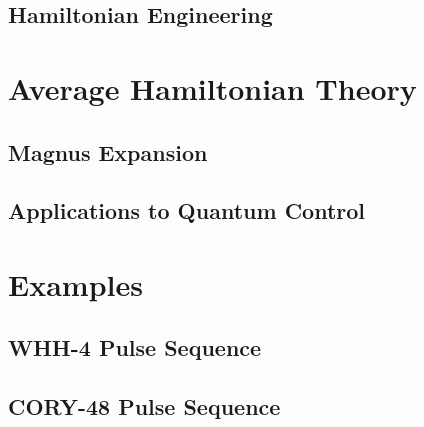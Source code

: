 
\lipsum[1]

\subsection{Hamiltonian Engineering}

\lipsum[1-4]

%

\section{Average Hamiltonian Theory}\label{sec:AHT}

\lipsum[1-2]

\subsection{Magnus Expansion}

\lipsum[1-2]

\subsection{Applications to Quantum Control}

\lipsum[1-5]


\section{Examples}

\lipsum[1]

\subsection{WHH-4 Pulse Sequence}

\lipsum[1-3]

\subsection{CORY-48 Pulse Sequence}

